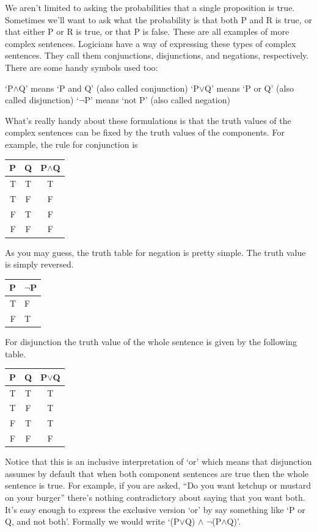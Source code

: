 \documentclass[]{tufte-book}
\begin{document}
We aren't limited to asking the probabilities that a single proposition is true. Sometimes we'll want to ask what the probability is that both P and R is true, or that either P or R is true, or that P is false. These are all examples of more complex sentences. Logicians have a way of expressing these types of complex sentences. They call them conjunctions, disjunctions, and negations, respectively. There are some handy symbols used too:

`P\(\wedge\)Q' means `P and Q' (also called conjunction)
`P\(\vee\)Q' means `P or Q' (also called disjunction)
`\(\neg\)P' means `not P' (also called negation)

What's really handy about these formulations is that the truth values of the complex sentences can be fixed by the truth values of the components. For example, the rule for conjunction is

\begin{longtable}[]{@{}rcc@{}}
\toprule
P & Q & P\(\wedge\)Q\tabularnewline
\midrule
\endhead
T & T & T\tabularnewline
T & F & F\tabularnewline
F & T & F\tabularnewline
F & F & F\tabularnewline
\bottomrule
\end{longtable}

As you may guess, the truth table for negation is pretty simple. The truth value is simply reversed.

\begin{longtable}[]{@{}rl@{}}
\toprule
P & \(\neg\)P\tabularnewline
\midrule
\endhead
T & F\tabularnewline
F & T\tabularnewline
\bottomrule
\end{longtable}

For disjunction the truth value of the whole sentence is given by the following table.

\begin{longtable}[]{@{}ccc@{}}
\toprule
P & Q & P\(\vee\)Q\tabularnewline
\midrule
\endhead
T & T & T\tabularnewline
T & F & T\tabularnewline
F & T & T\tabularnewline
F & F & F\tabularnewline
\bottomrule
\end{longtable}

Notice that this is an inclusive interpretation of `or' which means that disjunction assumes by default that when both component sentences are true then the whole sentence is true. For example, if you are asked, ``Do you want ketchup or mustard on your burger'' there's nothing contradictory about saying that you want both. It's easy enough to express the exclusive version `or' by say something like `P or Q, and not both'. Formally we would write `(P\(\vee\)Q) \(\wedge\) \(\neg\)(P\(\wedge\)Q)'.
\end{document}
